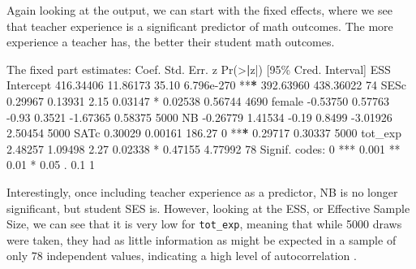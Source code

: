 \documentclass[
]{book}
\newenvironment{Shaded}{\begin{snugshade}}{\end{snugshade}}
\newcommand{\DecValTok}[1]{\textcolor[rgb]{0.00,0.00,0.81}{#1}}
\newcommand{\ErrorTok}[1]{\textcolor[rgb]{0.64,0.00,0.00}{\textbf{#1}}}
\newcommand{\FloatTok}[1]{\textcolor[rgb]{0.00,0.00,0.81}{#1}}
\newcommand{\FunctionTok}[1]{\textcolor[rgb]{0.00,0.00,0.00}{#1}}
\newcommand{\NormalTok}[1]{#1}
\newcommand{\SpecialCharTok}[1]{\textcolor[rgb]{0.00,0.00,0.00}{#1}}
\newcommand{\StringTok}[1]{\textcolor[rgb]{0.31,0.60,0.02}{#1}}
\begin{document}
Again looking at the output, we can start with the fixed effects, where we see that teacher experience is a significant predictor of math outcomes. The more experience a teacher has, the better their student math outcomes.

\begin{Shaded}
\begin{Highlighting}[]
\NormalTok{The fixed part estimates}\SpecialCharTok{:}  
\NormalTok{                Coef.   Std. Err.       z     }\FunctionTok{Pr}\NormalTok{(}\SpecialCharTok{\textgreater{}}\ErrorTok{|}\NormalTok{z}\SpecialCharTok{|}\NormalTok{)       [}\DecValTok{95}\NormalTok{\% Cred.   Interval]    ESS }
\NormalTok{Intercept   }\FloatTok{416.34406}    \FloatTok{11.86173}   \FloatTok{35.10}   \FloatTok{6.796e{-}270}  \SpecialCharTok{**}\ErrorTok{*}   \FloatTok{392.63960}   \FloatTok{438.36022}     \DecValTok{74} 
\NormalTok{SESc          }\FloatTok{0.29967}     \FloatTok{0.13931}    \FloatTok{2.15}      \FloatTok{0.03147}  \SpecialCharTok{*}       \FloatTok{0.02538}     \FloatTok{0.56744}   \DecValTok{4690} 
\NormalTok{female       }\SpecialCharTok{{-}}\FloatTok{0.53750}     \FloatTok{0.57763}   \SpecialCharTok{{-}}\FloatTok{0.93}       \FloatTok{0.3521}         \SpecialCharTok{{-}}\FloatTok{1.67365}     \FloatTok{0.58375}   \DecValTok{5000} 
\NormalTok{NB           }\SpecialCharTok{{-}}\FloatTok{0.26779}     \FloatTok{1.41534}   \SpecialCharTok{{-}}\FloatTok{0.19}       \FloatTok{0.8499}         \SpecialCharTok{{-}}\FloatTok{3.01926}     \FloatTok{2.50454}   \DecValTok{5000} 
\NormalTok{SATc          }\FloatTok{0.30029}     \FloatTok{0.00161}  \FloatTok{186.27}            \DecValTok{0}  \SpecialCharTok{**}\ErrorTok{*}     \FloatTok{0.29717}     \FloatTok{0.30337}   \DecValTok{5000} 
\NormalTok{tot\_exp       }\FloatTok{2.48257}     \FloatTok{1.09498}    \FloatTok{2.27}      \FloatTok{0.02338}  \SpecialCharTok{*}       \FloatTok{0.47155}     \FloatTok{4.77992}     \DecValTok{78} 
\NormalTok{Signif. codes}\SpecialCharTok{:}  \DecValTok{0} \StringTok{\textquotesingle{}***\textquotesingle{}} \FloatTok{0.001} \StringTok{\textquotesingle{}**\textquotesingle{}} \FloatTok{0.01} \StringTok{\textquotesingle{}*\textquotesingle{}} \FloatTok{0.05} \StringTok{\textquotesingle{}.\textquotesingle{}} \FloatTok{0.1} \StringTok{\textquotesingle{} \textquotesingle{}} \DecValTok{1}  
\end{Highlighting}
\end{Shaded}

Interestingly, once including teacher experience as a predictor, NB is no longer significant, but student SES is. However, looking at the ESS, or Effective Sample Size, we can see that it is very low for \texttt{tot\_exp}, meaning that while 5000 draws were taken, they had as little information as might be expected in a sample of only 78 independent values, indicating a high level of autocorrelation \citep{Leckie2013}.
\end{document}
